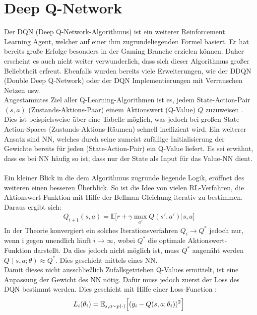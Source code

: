 \section{Deep Q-Network} \label{sec:Q-Learning}
Der DQN (Deep Q-Network-Algorithmus) ist ein weiterer Reinforcement Learning Agent, welcher auf einer ihm zugrundeliegenden Formel basiert. Er hat bereits große Erfolge besonders in der Gaming Branche erzielen können. Daher erscheint es auch nicht weiter verwunderlich, dass sich dieser Algorithmus großer Beliebtheit erfreut. Ebenfalls wurden bereits viele Erweiterungen, wie der DDQN (Double Deep Q-Network) oder der DQN Implementierungen mit Verrauschen Netzen usw.\\
Angestammtes Ziel aller Q-Learning-Algorithmen ist es, jedem State-Action-Pair $(s,a)$ (Zustands-Aktions-Paar) einem Aktionswert (Q-Value) $Q$ zuzuweisen \cite[S. 126]{DRL_Lapan}. Dies ist beispielsweise über eine Tabelle möglich, was jedoch bei großen State-Action-Spaces (Zustands-Aktions-Räumen) schnell ineffizient wird. Ein weiterer Ansatz sind NN, welches durch seine zumeist zufällige Initialisierung der Gewichte bereits für jeden (State-Action-Pair) ein Q-Value liefert. Es sei erwähnt, dass es bei NN häufig so ist, dass nur der State als Input für das Value-NN dient.\\
\\Ein kleiner Blick in die dem Algorithmus zugrunde liegende Logik, eröffnet des weiteren einen besseren Überblick. So ist die Idee von vielen RL-Verfahren, die Aktionswert Funktion mit Hilfe der Bellman-Gleichung iterativ zu bestimmen. Daraus ergibt sich:
\begin{align}
	Q_{i+1}(s,a) = \mathbb{E} \bigl\lbrack r + \gamma \max_{a'} Q(s',a')|s,a \bigr\rbrack
\end{align}
In der Theorie konvergiert ein solches Iterationsverfahren $Q_i \longrightarrow Q^*$ jedoch nur, wenn i gegen unendlich läuft $i \longrightarrow \infty$, wobei $Q^*$ die optimale Aktionswert-Funktion darstellt. Da dies jedoch nicht möglich ist, muss $Q^*$ angenäht werden $Q(s,a;\theta) \approx Q^* $. Dies geschieht mittels eines NN.\\
Damit dieses nicht ausschließlich Zufallsgetrieben Q-Values ermittelt, ist eine Anpassung der Gewicht des NN nötig. Dafür muss jedoch zuerst der Loss des DQN bestimmt werden. Dies geschieht mit Hilfe einer Loss-Function :
\begin{align}
	\label{eq:DQN_Loss}
	L_i(\theta_i) = \mathbb{E}_{s,a \sim p(\cdot)} \Bigl\lbrack (y_i - Q(s,a;\theta_i))^2 \Bigr\rbrack
\end{align}
